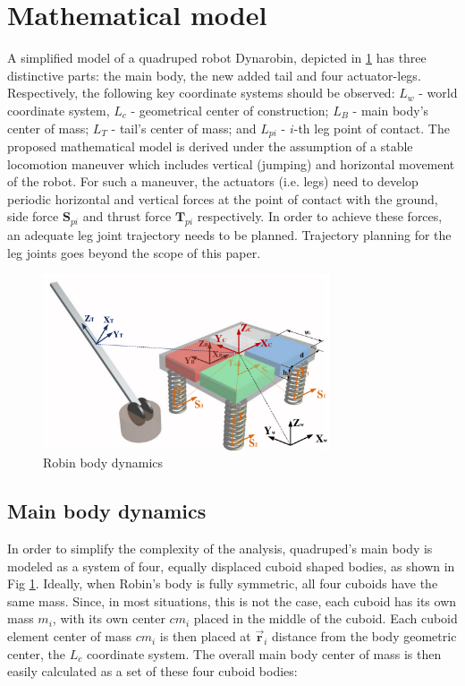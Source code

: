 \section{Mathematical model}\label{sec:MathModel}
A simplified model of a quadruped robot Dynarobin, depicted in \ref{fig:rmoment} has three distinctive parts: the main body, the new added tail and four actuator-legs. Respectively, the following key coordinate systems should be observed: $L_w$ - world coordinate system, $L_c$ - geometrical center of construction; $L_B$ - main body's center of mass; $L_T$ - tail's center of mass; and $L_{pi}$ - $i$-th leg point of contact. The proposed mathematical model is derived under the assumption of a stable locomotion maneuver which includes vertical (jumping) and horizontal movement of the robot. For such a maneuver, the actuators (i.e. legs) need to develop periodic horizontal and vertical forces at the point of contact with the ground, side force $\textbf{S}_{pi}$ and thrust force $\textbf{T}_{pi}$ respectively. In order to achieve these forces, an adequate leg joint trajectory needs to be planned. Trajectory planning for the leg joints goes beyond the scope of this paper. 

\begin{figure}
	\centering
	\includegraphics[width=85mm]{./pictures/RobinMoment.pdf}
	\caption{Robin body dynamics}
	\label{fig:rmoment}
\end{figure}

\subsection{Main body dynamics}
In order to simplify the complexity of the analysis, quadruped's main body is modeled as a system of four, equally displaced cuboid shaped bodies, as shown in Fig \ref{fig:rmoment}. Ideally, when Robin's body is fully symmetric, all four cuboids have the same mass. Since, in most situations, this is not the case, each cuboid has its own mass $m_i$, with its own center $cm_i$ placed in the middle of the cuboid. Each cuboid element center of mass $cm_i$ is then placed at $\vec{\textbf{r}}_i$ distance from the body geometric center, the $L_c$ coordinate system. The overall main body center of mass is then easily calculated as a set of these four cuboid bodies:
 
